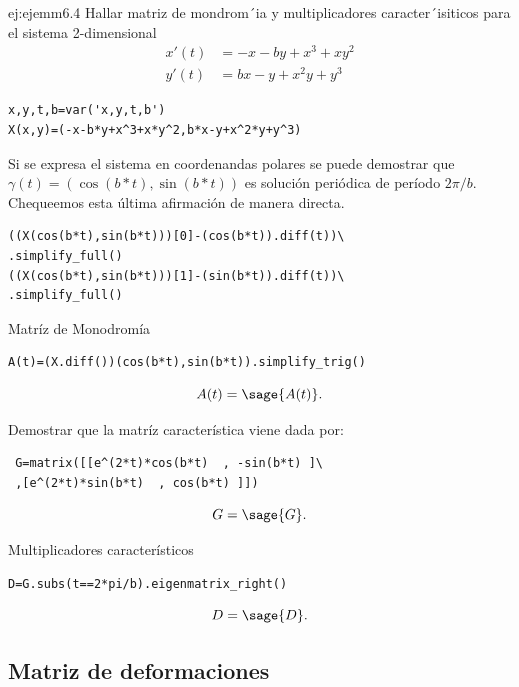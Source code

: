  \begin{ejemplo}{ej:ejemm6.4}\emph{\cite[ Ejemplo 6.4 ]{DavidBetounes488}} Hallar matriz de mondrom´ia y multiplicadores caracter´isiticos para el sistema 2-dimensional
 \[
 \begin{array}{cc}
  x'(t)&=-x-by+x^3+xy^2\\
  y'(t)&=bx-y+x^2y+y^3
 \end{array}
 \]

\begin{lstlisting}
x,y,t,b=var('x,y,t,b')
X(x,y)=(-x-b*y+x^3+x*y^2,b*x-y+x^2*y+y^3)
\end{lstlisting}   

Si se expresa el sistema en coordenandas polares se puede demostrar que $\gamma(t)=(\cos(b*t),\sin(b*t))$ es solución periódica de período $2\pi/b$. Chequeemos esta última afirmación de manera directa.
\begin{lstlisting}
((X(cos(b*t),sin(b*t)))[0]-(cos(b*t)).diff(t))\
.simplify_full()
((X(cos(b*t),sin(b*t)))[1]-(sin(b*t)).diff(t))\
.simplify_full()
\end{lstlisting} 
Matríz de Monodromía
\begin{lstlisting}
A(t)=(X.diff())(cos(b*t),sin(b*t)).simplify_trig()
\end{lstlisting} 
\[A(t)=\sage{A(t)}.\]
\begin{ejercicio}{}
 Demostrar que la matríz característica viene dada por: 
\begin{lstlisting}
 G=matrix([[e^(2*t)*cos(b*t)  , -sin(b*t) ]\
 ,[e^(2*t)*sin(b*t)  , cos(b*t) ]])
 \end{lstlisting} 
 \[G=\sage{G}.\]

\end{ejercicio}
 Multiplicadores característicos
 \begin{lstlisting}
D=G.subs(t==2*pi/b).eigenmatrix_right()
 \end{lstlisting} 
  \begin{equation}\label{eq:ejempl6.4}D=\sage{D}.\end{equation}


 \end{ejemplo}






\subsection{Matriz de deformaciones} 

